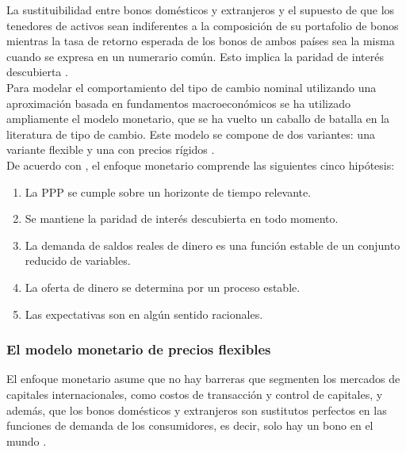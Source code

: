 	
	La sustituibilidad entre bonos domésticos y extranjeros y el supuesto de que los tenedores de activos sean indiferentes a la composición de su portafolio de bonos mientras la tasa de retorno esperada de los bonos de ambos países sea la misma cuando se expresa en un numerario común. Esto implica la paridad de interés descubierta \parencite{frankel1993exchange}.\\ 
	
	Para modelar el comportamiento del tipo de cambio nominal utilizando una aproximación basada en fundamentos macroeconómicos se ha utilizado ampliamente el modelo monetario, que se ha vuelto un caballo de batalla en la literatura de tipo de cambio. Este modelo se compone de dos variantes: una variante flexible y una con precios rígidos \parencite{exchecon}.\\
	
	De acuerdo con \textcite{boughton1988monetary}, el enfoque monetario comprende las siguientes cinco hipótesis: 
	\begin{enumerate}
		\item La PPP se cumple sobre un horizonte de tiempo relevante.
		\item Se mantiene la paridad de interés descubierta en todo momento.
		\item La demanda de saldos reales de dinero es una función estable de un conjunto reducido de variables.
		\item La oferta de dinero se determina por un proceso estable.
		\item Las expectativas son en algún sentido racionales.
	\end{enumerate}
	
	\subsubsection{El modelo monetario de precios flexibles}
	
	El enfoque monetario asume que no hay barreras que segmenten los mercados de capitales internacionales, como costos de transacción y control de capitales, y además, que los bonos domésticos y extranjeros son sustitutos perfectos en las funciones de demanda de los consumidores, es decir, solo hay un bono en el mundo \parencite{frankel1993exchange}.\\
	
